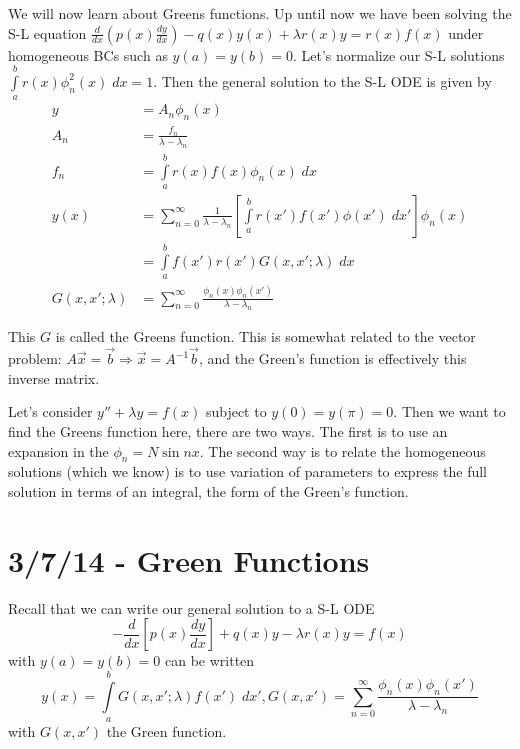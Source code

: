 \documentclass[10pt]{report}
\newcommand{\rd}[2]{\frac{d#1}{d#2}}
\begin{document}
We will now learn about Greens functions. Up until now we have been solving the S-L equation $\rd{}{x}\left( p(x)\rd{y}{x} \right) - q(x)y(x) + \lambda r(x) y = r(x) f(x)$ under homogeneous BCs such as $y(a) = y(b) = 0$. Let's normalize our S-L solutions $\displaystyle\int\limits_{a}^{b}r(x) \phi^2_n(x)\;dx = 1$. Then the general solution to the S-L ODE is given by
\begin{align}
    y &= A_n \phi_n(x)\\
    A_n &= \frac{f_n}{\lambda - \lambda_n}\\
    f_n &= \displaystyle\int\limits_{a}^{b}r(x)f(x)\phi_n(x)\;dx\\
    y(x)& = \sum_{n=0}^{\infty}\frac{1}{\lambda - \lambda_n}\left[ \displaystyle\int\limits_{a}^{b}r(x')f(x')\phi(x')\;dx' \right]\phi_n(x)\\
    &= \displaystyle\int\limits_{a}^{b}f(x')r(x')G(x,x';\lambda)\;dx\\
    G(x,x';\lambda) &= \sum_{n=0}^{\infty}\frac{\phi_n(x)\phi_n(x')}{\lambda - \lambda_n}
\end{align}

This $G$ is called the Greens function. This is somewhat related to the vector problem: $A\vec{x} = \vec{b} \Rightarrow \vec{x} = A^{-1}\vec{b}$, and the Green's function is effectively this inverse matrix. 

Let's consider $y'' + \lambda y = f(x)$ subject to $y(0) = y(\pi) = 0$. Then we want to find the Greens function here, there are two ways. The first is to use an expansion in the $\phi_n = N \sin nx$. The second way is to relate the homogeneous solutions (which we know) is to use variation of parameters to express the full solution in terms of an integral, the form of the Green's function. 
\chapter{3/7/14 - Green Functions}

Recall that we can write our general solution to a S-L ODE
\begin{equation}
    -\rd{}{x}\left[ p(x)\rd{y}{x} \right] + q(x)y - \lambda r(x)y = f(x)
\end{equation}
with $y(a) = y(b) = 0$ can be written
\begin{equation}
    y(x) = \displaystyle\int\limits_{a}^{b}G(x,x';\lambda)f(x')\;dx', G(x,x') = \sum_{n=0}^{\infty}\frac{\phi_n(x)\phi_n(x')}{\lambda - \lambda_n}\label{3.7.Green}
\end{equation}
with $G(x,x')$ the Green function. 
\end{document}
